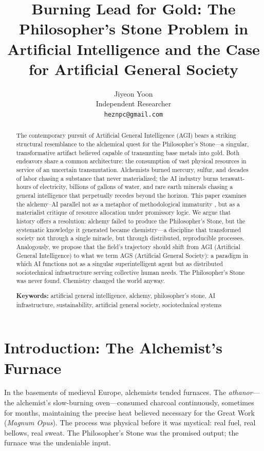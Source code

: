 \documentclass[12pt]{article}
\title{Burning Lead for Gold: The Philosopher's Stone Problem in Artificial Intelligence and the Case for Artificial General Society}
\author{Jiyeon Yoon\\
Independent Researcher\\
\texttt{heznpc@gmail.com}}
\date{}
\begin{document}
\maketitle

\begin{abstract}
The contemporary pursuit of Artificial General Intelligence (AGI) bears a striking structural resemblance to the alchemical quest for the Philosopher's Stone---a singular, transformative artifact believed capable of transmuting base metals into gold. Both endeavors share a common architecture: the consumption of vast physical resources in service of an uncertain transmutation. Alchemists burned mercury, sulfur, and decades of labor chasing a substance that never materialized; the AI industry burns terawatt-hours of electricity, billions of gallons of water, and rare earth minerals chasing a general intelligence that perpetually recedes beyond the horizon. This paper examines the alchemy--AI parallel not as a metaphor of methodological immaturity \citep[cf.][]{rahimi2017}, but as a materialist critique of resource allocation under promissory logic. We argue that history offers a resolution: alchemy failed to produce the Philosopher's Stone, but the systematic knowledge it generated became chemistry---a discipline that transformed society not through a single miracle, but through distributed, reproducible processes. Analogously, we propose that the field's trajectory should shift from AGI (Artificial General Intelligence) to what we term AGS (Artificial General Society): a paradigm in which AI functions not as a singular superintelligent agent but as distributed sociotechnical infrastructure serving collective human needs. The Philosopher's Stone was never found. Chemistry changed the world anyway.

\medskip
\noindent\textbf{Keywords:} artificial general intelligence, alchemy, philosopher's stone, AI infrastructure, sustainability, artificial general society, sociotechnical systems
\end{abstract}

\section{Introduction: The Alchemist's Furnace}
\label{sec:introduction}

In the basements of medieval Europe, alchemists tended furnaces. The \emph{athanor}---the alchemist's slow-burning oven---consumed charcoal continuously, sometimes for months, maintaining the precise heat believed necessary for the Great Work (\emph{Magnum Opus}). The process was physical before it was mystical: real fuel, real bellows, real sweat. The Philosopher's Stone was the promised output; the furnace was the undeniable input.
\end{document}
